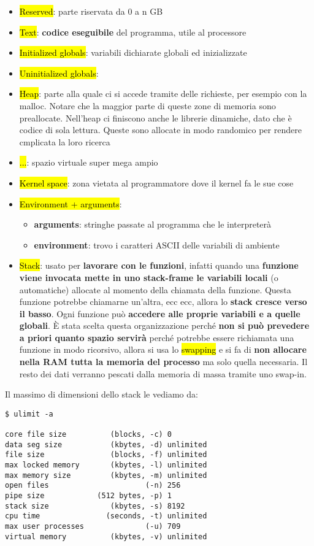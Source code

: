 \begin{itemize}
	\item \hl{Reserved}: parte riservata da 0 a n GB
	\item \hl{Text}: \textbf{codice eseguibile} del programma, utile al processore
	\item \hl{Initialized globals}: variabili dichiarate globali ed inizializzate
	\item \hl{Uninitialized globals}: 
	\item \hl{Heap}: parte alla quale ci si accede tramite delle richieste, per esempio con la malloc. Notare che la maggior parte di queste zone di memoria sono preallocate. Nell'heap ci finiscono anche le librerie dinamiche, dato che è codice di sola lettura. Queste sono allocate in modo randomico per rendere cmplicata la loro ricerca
	\item \hl{...}: spazio virtuale super mega ampio
	\item \hl{Kernel space}: zona vietata al programmatore dove il kernel fa le sue cose
	\item \hl{Environment + arguments}:
		\begin{itemize}
			\item \textbf{arguments}: stringhe passate al programma che le interpreterà
			\item \textbf{environment}: trovo i caratteri ASCII delle variabili di ambiente
		\end{itemize}
	\item \hl{Stack}: usato per \textbf{lavorare con le funzioni}, infatti quando una \textbf{funzione viene invocata mette in uno stack-frame le variabili locali} (o automatiche) allocate al momento della chiamata della funzione. Questa funzione potrebbe chiamarne un'altra, ecc ecc, allora lo \textbf{stack cresce verso il basso}. Ogni funzione può \textbf{accedere alle proprie variabili e a quelle globali}. È stata scelta questa organizzazione perché \textbf{non si può prevedere a priori quanto spazio servirà} perché potrebbe essere richiamata una funzione in modo ricorsivo, allora si usa lo \hl{swapping} e si fa di \textbf{non allocare nella RAM tutta la memoria del processo} ma solo quella necessaria. Il resto dei dati verranno pescati dalla memoria di massa tramite uno swap-in. 
\end{itemize}

Il massimo di dimensioni dello stack le vediamo da:

\begin{lstlisting}
$ ulimit -a

core file size          (blocks, -c) 0
data seg size           (kbytes, -d) unlimited
file size               (blocks, -f) unlimited
max locked memory       (kbytes, -l) unlimited
max memory size         (kbytes, -m) unlimited
open files                      (-n) 256
pipe size            (512 bytes, -p) 1
stack size              (kbytes, -s) 8192
cpu time               (seconds, -t) unlimited
max user processes              (-u) 709
virtual memory          (kbytes, -v) unlimited
\end{lstlisting}

